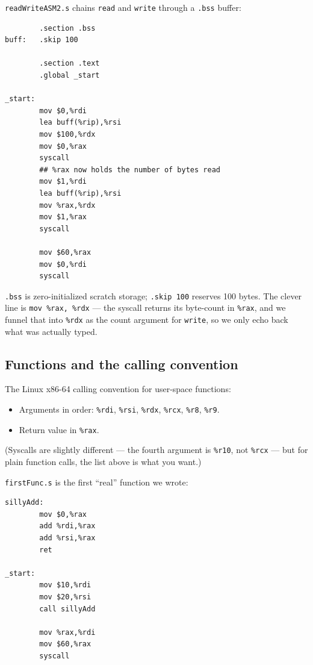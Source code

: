 \documentclass[11pt]{article}
\begin{document}
\texttt{readWriteASM2.s} chains \texttt{read} and \texttt{write}
through a \texttt{.bss} buffer:

\begin{lstlisting}
        .section .bss
buff:   .skip 100

        .section .text
        .global _start

_start:
        mov $0,%rdi
        lea buff(%rip),%rsi
        mov $100,%rdx
        mov $0,%rax
        syscall
        ## %rax now holds the number of bytes read
        mov $1,%rdi
        lea buff(%rip),%rsi
        mov %rax,%rdx
        mov $1,%rax
        syscall

        mov $60,%rax
        mov $0,%rdi
        syscall
\end{lstlisting}

\texttt{.bss} is zero-initialized scratch storage; \texttt{.skip 100}
reserves 100 bytes. The clever line is \texttt{mov \%rax, \%rdx} ---
the syscall returns its byte-count in \texttt{\%rax}, and we funnel
that into \texttt{\%rdx} as the count argument for \texttt{write},
so we only echo back what was actually typed.

\subsection*{Functions and the calling convention}

The Linux x86-64 calling convention for user-space functions:
\begin{itemize}
  \item Arguments in order: \texttt{\%rdi}, \texttt{\%rsi},
    \texttt{\%rdx}, \texttt{\%rcx}, \texttt{\%r8}, \texttt{\%r9}.
  \item Return value in \texttt{\%rax}.
\end{itemize}
(Syscalls are slightly different --- the fourth argument is
\texttt{\%r10}, not \texttt{\%rcx} --- but for plain function calls,
the list above is what you want.)

\texttt{firstFunc.s} is the first ``real'' function we wrote:

\begin{lstlisting}
sillyAdd:
        mov $0,%rax
        add %rdi,%rax
        add %rsi,%rax
        ret

_start:
        mov $10,%rdi
        mov $20,%rsi
        call sillyAdd

        mov %rax,%rdi
        mov $60,%rax
        syscall
\end{lstlisting}
\end{document}
